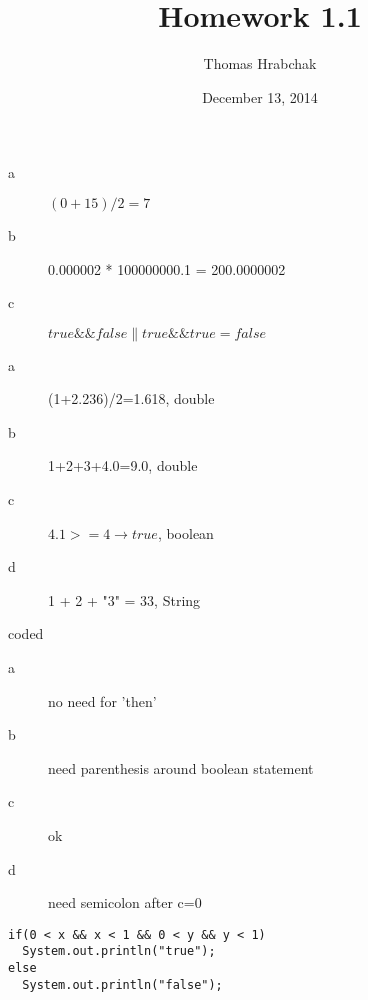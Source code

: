 \documentclass[10pt,a4paper]{article}
\title{Homework 1.1}
\author{Thomas Hrabchak}
\date{December 13, 2014}
\newenvironment{problem}[2][Problem]{\begin{trivlist}
	\item[\hskip \labelsep {\bfseries #1}\hskip \labelsep {\bfseries #2}]}{\end{trivlist}}
\begin{document}
\maketitle

\begin{problem}{1.1.1}
\end{problem}


\begin{description}
  \item[a] \( (0+15)/2 =7 \)
  \item[b] 0.000002 * 100000000.1 = 200.0000002
  \item[c] \( true \&\& false \| true \&\& true = false \)
\end{description}

\begin{problem}{1.1.2}
\end{problem}

\begin{description}
  \item[a] (1+2.236)/2=1.618, double
  \item[b] 1+2+3+4.0=9.0, double
  \item[c] \(4.1 >= 4 \rightarrow true\), boolean
  \item[d] 1 + 2 + "3" = 33, String
\end{description}

\begin{problem}{1.1.3}coded
\end{problem}

\begin{problem}{1.1.4}
\end{problem}

\begin{description}
  \item[a] no need for 'then'
  \item[b] need parenthesis around boolean statement
  \item[c] ok
  \item[d] need semicolon after c=0
\end{description}

\begin{problem}{1.1.5}
\end{problem}

\begin{verbatim}
if(0 < x && x < 1 && 0 < y && y < 1)
  System.out.println("true");
else
  System.out.println("false");
\end{verbatim}
\end{document}
